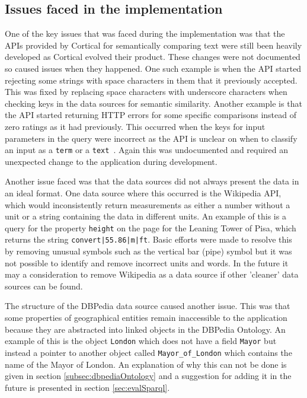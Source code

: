 \documentclass[authoryearcitations]{UoYCSproject}
\begin{document}
\subsection{Issues faced in the implementation}
One of the key issues that was faced during the implementation was that the APIs provided by Cortical for semantically comparing text were still been heavily developed as Cortical evolved their product. These changes were not documented so caused issues when they happened. One such example is when the API started rejecting some strings with space characters in them that it previously accepted. This was fixed by replacing space characters with underscore characters when checking keys in the data sources for semantic similarity. Another example is that the API started returning HTTP errors for some specific comparisons instead of zero ratings as it had previously. This occurred when the keys for input parameters in the query were incorrect as the API is unclear on when to classify an input as a \texttt{term} or a \texttt{text}~\cite{serviceCorticalSim}. Again this was undocumented and required an unexpected change to the application during development.

Another issue faced was that the data sources did not always present the data in an ideal format. One data source where this occurred is the Wikipedia API, which would inconsistently return measurements as either a number without a unit or a string containing the data in different units. An example of this is a query for the property \texttt{height} on the page for the Leaning Tower of Pisa, which returns the string \texttt{convert|55.86|m|ft}. Basic efforts were made to resolve this by removing unusual symbols such as the vertical bar (pipe) symbol but it was not possible to identify and remove incorrect units and words. In the future it may a consideration to remove Wikipedia as a data source if other 'cleaner' data sources can be found.

The structure of the DBPedia data source caused another issue. This was that some properties of geographical entities remain inaccessible to the application because they are abstracted into linked objects in the DBPedia Ontology. An example of this is the object \texttt{London} which does not have a field \texttt{Mayor} but instead a pointer to another object called \texttt{Mayor\_of\_London} which contains the name of the Mayor of London. An explanation of why this can not be done is given in section \ref{subsec:dbpediaOntology} and a suggestion for adding it in the future is presented in section \ref{sec:evalSparql}.
\end{document}
